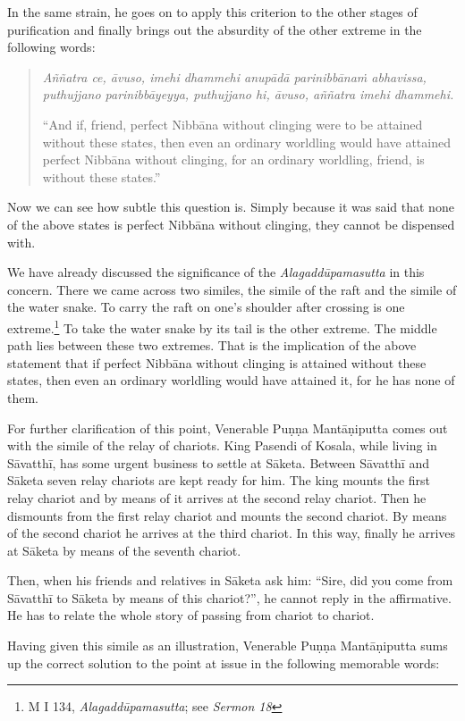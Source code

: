 In the same strain, he goes on to apply this criterion to the other stages of purification and finally brings out the absurdity of the other extreme in the following words:

\begin{quote}
\emph{Aññatra ce, āvuso, imehi dhammehi anupādā parinibbānaṁ abhavissa, puthujjano parinibbāyeyya, puthujjano hi, āvuso, aññatra imehi dhammehi.}

``And if, friend, perfect Nibbāna without clinging were to be attained without these states, then even an ordinary worldling would have attained perfect Nibbāna without clinging, for an ordinary worldling, friend, is without these states.''
\end{quote}

Now we can see how subtle this question is. Simply because it was said that none of the above states is perfect Nibbāna without clinging, they cannot be dispensed with.

We have already discussed the significance of the \emph{Alagaddūpamasutta} in this concern. There we came across two similes, the simile of the raft and the simile of the water snake. To carry the raft on one's shoulder after crossing is one extreme.\footnote{M I 134, \emph{Alagaddūpamasutta}; see \emph{Sermon 18}} To take the water snake by its tail is the other extreme. The middle path lies between these two extremes. That is the implication of the above statement that if perfect Nibbāna without clinging is attained without these states, then even an ordinary worldling would have attained it, for he has none of them.

For further clarification of this point, Venerable Puṇṇa Mantāṇiputta comes out with the simile of the relay of chariots. King Pasendi of Kosala, while living in Sāvatthī, has some urgent business to settle at Sāketa. Between Sāvatthī and Sāketa seven relay chariots are kept ready for him. The king mounts the first relay chariot and by means of it arrives at the second relay chariot. Then he dismounts from the first relay chariot and mounts the second chariot. By means of the second chariot he arrives at the third chariot. In this way, finally he arrives at Sāketa by means of the seventh chariot.

Then, when his friends and relatives in Sāketa ask him: ``Sire, did you come from Sāvatthī to Sāketa by means of this chariot?'', he cannot reply in the affirmative. He has to relate the whole story of passing from chariot to chariot.

Having given this simile as an illustration, Venerable Puṇṇa Mantāṇiputta sums up the correct solution to the point at issue in the following memorable words:

